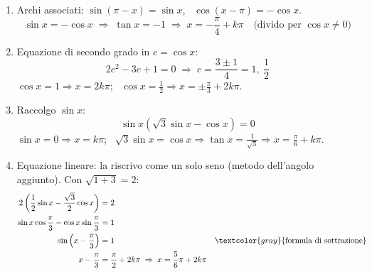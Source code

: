 \begin{question}[ID=4.1, subtitle={Equazioni goniometriche di vario tipo — serie 1}, tags={goniometria, equazioni goniometriche}, difficulty=media]
\begin{explanation}
\begin{enumerate}
\[\begin{aligned}
    2x &= \dfrac\pi{12}+k\pi \;\Rightarrow\; x=\dfrac\pi{24}+k\dfrac\pi2
    \end{aligned}\]
    \item Archi associati: $\sin(\pi-x)=\sin x$, \ $\cos(x-\pi)=-\cos x$.
    \[ \sin x=-\cos x \;\Rightarrow\; \tan x=-1 \;\Rightarrow\; x=-\dfrac\pi4+k\pi \quad \text{(divido per $\cos x\neq0$)} \]
    \item Equazione di secondo grado in $c=\cos x$:
    \[ 2c^2-3c+1=0 \;\Rightarrow\; c=\dfrac{3\pm1}{4}=1,\ \dfrac12 \]
    $\cos x=1 \Rightarrow x=2k\pi$; \ $\cos x=\tfrac12 \Rightarrow x=\pm\tfrac\pi3+2k\pi$.
    \item Raccolgo $\sin x$:
    \[ \sin x\left(\sqrt3\sin x-\cos x\right)=0 \]
    $\sin x=0 \Rightarrow x=k\pi$; \ $\sqrt3\sin x=\cos x \Rightarrow \tan x=\tfrac1{\sqrt3} \Rightarrow x=\tfrac\pi6+k\pi$.
    \item Equazione lineare: la riscrivo come un solo seno (metodo dell'angolo aggiunto). Con $\sqrt{1+3}=2$:
    \[\begin{aligned}
    2\left(\dfrac12\sin x-\dfrac{\sqrt3}{2}\cos x\right) &= 2\\
    \sin x\cos\dfrac\pi3-\cos x\sin\dfrac\pi3 &= 1\\
    \sin\left(x-\dfrac\pi3\right) &= 1 && \textcolor{gray}{\text{formula di sottrazione}}\\
    x-\dfrac\pi3 &= \dfrac\pi2+2k\pi \;\Rightarrow\; x=\dfrac56\pi+2k\pi
    \end{aligned}\]
\end{enumerate}
\end{explanation}
\end{question}


